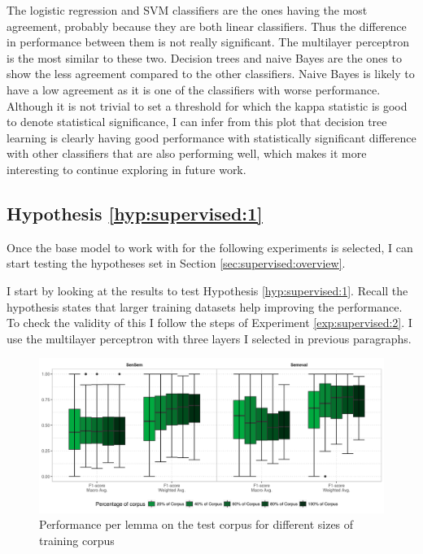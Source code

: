The logistic regression and SVM classifiers are the ones having the most
agreement, probably because they are both linear classifiers. Thus the
difference in performance between them is not really significant. The
multilayer perceptron is the most similar to these two. Decision trees and
naive Bayes are the ones to show the less agreement compared to the other
classifiers. Naive Bayes is likely to have a low agreement as it is one of the
classifiers with worse performance. Although it is not trivial to set a
threshold for which the kappa statistic is good to denote statistical
significance, I can infer from this plot that decision tree learning is clearly
having good performance with statistically significant difference with other
classifiers that are also performing well, which makes it more interesting to
continue exploring in future work. 

\subsection{Hypothesis \ref{hyp:supervised:1}}\label{sec:supervised:hyp:1}

Once the base model to work with for the following experiments is selected, I
can start testing the hypotheses set in Section \ref{sec:supervised:overview}.

I start by looking at the results to test Hypothesis \ref{hyp:supervised:1}.
Recall the hypothesis states that larger training datasets help improving the
performance. To check the validity of this I follow the steps of Experiment
\ref{exp:supervised:2}. I use the multilayer perceptron with three layers
I selected in previous paragraphs.

\begin{figure}[ht]
	\includegraphics[width=\textwidth]{plots/supervised/performance_progress}
  \caption{Performance per lemma on the test corpus for different sizes of
  training corpus}
  \label{fig:supervised:performance_progression}
\end{figure}

